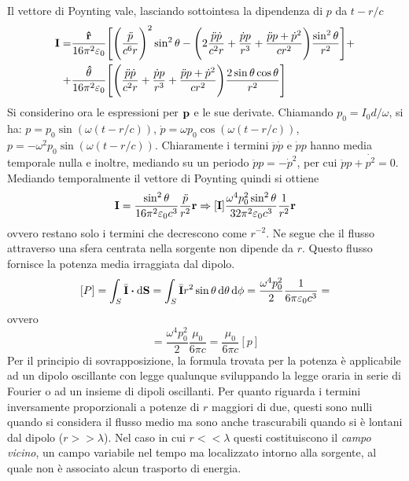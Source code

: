 Il vettore di Poynting vale, lasciando sottointesa la dipendenza di $p$ da $t-r/c$
\[
    \begin{split}
        \vb{I}=&\frac{\vu{r}}{16\pi^2\varepsilon_0}\Biggl[ \Biggl(\frac{\ddot{p}}{c^6r}\Biggr)^2 \sin^2{\theta}-
        \Biggl(2\frac{\ddot{p}\dot{p}}{c^2r}+\frac{\dot{p}p}{r^3}+\frac{\ddot{p}p+\dot{p}^2}{cr^2}\Biggr)\frac{\sin^2{\theta}}{r^2}\Biggr]+ \\
        +&\frac{\vu{\theta}}{16\pi^2\varepsilon_0}\Biggl[ \Biggl(\frac{\ddot{p}\dot{p}}{c^2r}+\frac{\dot{p}p}{r^3}+
        \frac{\ddot{p}p+\dot{p}^2}{cr^2}\Biggr)\frac{2\sin{\theta}\cos{\theta}}{r^2} \Biggr]
    \end{split}
\]
Si considerino ora le espressioni per $\vb{p}$ e le sue derivate. Chiamando $p_0=I_0d/\omega$, si ha:
$p=p_0\sin(\omega(t-r/c))$, $\dot{p}=\omega p_0\cos(\omega(t-r/c))$, $p=-\omega^2p_0\sin(\omega(t-r/c))$.
Chiaramente i termini $\ddot{p}\dot{p}$ e $\dot{p}p$ hanno media temporale nulla e inoltre, mediando su un
periodo $\ddot{p}p=-\dot{p}^2$, per cui $\ddot{p}p+\dot{p^2}=0$.
Mediando temporalmente il vettore di Poynting quindi si ottiene
\begin{equation}
    \vb{I}=\frac{\sin^2{\theta}}{16\pi^2\varepsilon_0 c^3}\frac{\ddot{p}}{r^2}\vb{r}\Rightarrow
    [\vb{I}]\frac{\omega^4 p_0^2 \sin^2{\theta}}{32\pi^2\varepsilon_0 c^3}\frac{1}{r^2}\vb{r}
    \label{eqn:valormedio_poynting}
\end{equation}
ovvero restano solo i termini che decrescono come $r^{-2}$. Ne segue che il flusso attraverso una sfera centrata
nella sorgente non dipende da $r$. Questo flusso fornisce la potenza media irraggiata dal dipolo.
\[
    [P]=\int_S\bar{\vb{I}}\vdot\dd{\vb{S}}= \int_S \bar{\vb{I}}r^2\sin{\theta}\dd{\theta}\dd{\phi}=\frac{\omega^4 p_0^2}{2}\rec{6\pi\epsilon_0 c^3}=
\]
ovvero
\begin{equation}
    [P]=\frac{\omega^4 p_0^2}{2}\frac{\mu_0}{6\pi c}=\frac{\mu_0}{6\pi c}[p]
    \label{eqn:potenza_dipolo}
\end{equation}
Per il principio di sovrapposizione, la formula trovata per la potenza è applicabile ad un dipolo oscillante con legge
qualunque sviluppando la legge oraria in serie di Fourier o ad un insieme di dipoli oscillanti.
Per quanto riguarda i termini inversamente proporzionali a potenze di $r$ maggiori di due, questi sono nulli quando si
considera il flusso medio ma sono anche trascurabili quando si è lontani dal dipolo ($r>>\lambda$). Nel caso in cui
$r<<\lambda$ questi costituiscono il \textit{campo vicino}, un campo variabile nel tempo ma localizzato intorno alla
sorgente, al quale non è associato alcun trasporto di energia.

